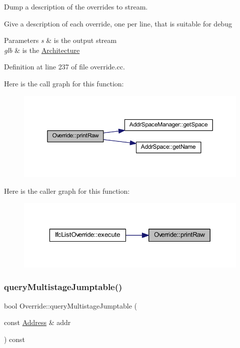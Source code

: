 Dump a description of the overrides to stream. 

Give a description of each override, one per line, that is suitable for debug 
\begin{DoxyParams}{Parameters}
{\em s} & is the output stream \\
\hline
{\em glb} & is the \mbox{\hyperlink{class_architecture}{Architecture}} \\
\hline
\end{DoxyParams}


Definition at line 237 of file override.\+cc.

Here is the call graph for this function\+:
\nopagebreak
\begin{figure}[H]
\begin{center}
\leavevmode
\includegraphics[width=350pt]{class_override_a8892cbe3b73a6deb23345088f86f5593_cgraph}
\end{center}
\end{figure}
Here is the caller graph for this function\+:
\nopagebreak
\begin{figure}[H]
\begin{center}
\leavevmode
\includegraphics[width=329pt]{class_override_a8892cbe3b73a6deb23345088f86f5593_icgraph}
\end{center}
\end{figure}
\mbox{\label{class_override_a49748ed2ed69fc5be1baf9921d8f7028}} 
\subsubsection{\texorpdfstring{queryMultistageJumptable()}{queryMultistageJumptable()}}
{\footnotesize\ttfamily bool Override\+::query\+Multistage\+Jumptable (\begin{DoxyParamCaption}\item[{const \mbox{\hyperlink{class_address}{Address}} \&}]{addr }\end{DoxyParamCaption}) const}



